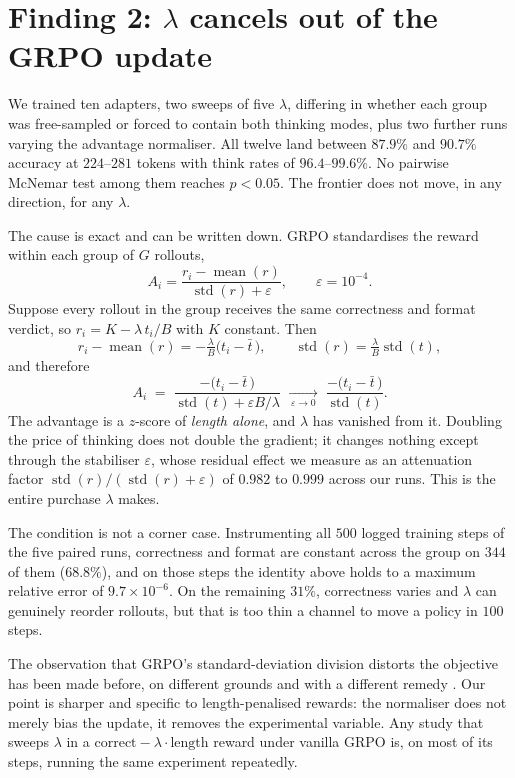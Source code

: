 \documentclass[10pt,twocolumn]{article}
\newcommand{\lam}{\lambda}
\begin{document}
\section{Finding 2: $\lam$ cancels out of the GRPO update}
\label{sec:cancel}

We trained ten adapters, two sweeps of five $\lam$, differing in whether each
group was free-sampled or forced to contain both thinking modes, plus two
further runs varying the advantage normaliser. All twelve land between $87.9\%$
and $90.7\%$ accuracy at $224$--$281$ tokens with think rates of $96.4$--$99.6\%$.
No pairwise McNemar test among them reaches $p<0.05$. The frontier does not move,
in any direction, for any $\lam$.

The cause is exact and can be written down. GRPO standardises the reward within
each group of $G$ rollouts,
\[
  A_i = \frac{r_i - \operatorname{mean}(r)}{\operatorname{std}(r) + \varepsilon},
  \qquad \varepsilon = 10^{-4}.
\]
Suppose every rollout in the group receives the same correctness and format
verdict, so $r_i = K - \lam\, t_i / B$ with $K$ constant. Then
\[
  r_i - \operatorname{mean}(r) = -\tfrac{\lam}{B}\big(t_i - \bar t\,\big),
  \qquad
  \operatorname{std}(r) = \tfrac{\lam}{B}\operatorname{std}(t),
\]
and therefore
\[
  A_i \;=\; \frac{-\big(t_i - \bar t\,\big)}{\operatorname{std}(t) + \varepsilon B/\lam}
  \;\xrightarrow[\ \varepsilon \to 0\ ]{}\;
  \frac{-\big(t_i - \bar t\,\big)}{\operatorname{std}(t)} .
\]
The advantage is a $z$-score of \emph{length alone}, and $\lam$ has vanished from
it. Doubling the price of thinking does not double the gradient; it changes
nothing except through the stabiliser $\varepsilon$, whose residual effect we
measure as an attenuation factor
$\operatorname{std}(r)/(\operatorname{std}(r)+\varepsilon)$ of $0.982$ to $0.999$
across our runs. This is the entire purchase $\lam$ makes.

The condition is not a corner case. Instrumenting all $500$ logged training steps
of the five paired runs, correctness and format are constant across the group on
$344$ of them ($68.8\%$), and on those steps the identity above holds to a maximum
relative error of $9.7\times10^{-6}$. On the remaining $31\%$, correctness varies
and $\lam$ can genuinely reorder rollouts, but that is too thin a channel to move
a policy in $100$ steps.

The observation that GRPO's standard-deviation division distorts the objective
has been made before, on different grounds and with a different remedy
\cite{liu2025drgrpo}. Our point is sharper and specific to length-penalised
rewards: the normaliser does not merely bias the update, it removes the
experimental variable. Any study that sweeps $\lam$ in a
$\text{correct}-\lam\cdot\text{length}$ reward under vanilla GRPO is, on most of
its steps, running the same experiment repeatedly.
\end{document}
